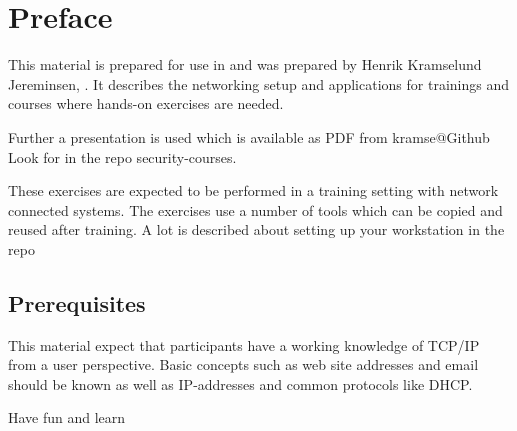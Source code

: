 \documentclass[a4paper,11pt,notitlepage]{report}
\begin{document}
\rm
{}

\newcommand{\subject}[1]{Software Security course}
\newcommand{\kursus}[1]{Software Security course}
\newcommand{\kursusnavn}[1]{Software Security course\\ exercises}



\setcounter{tocdepth}{0}

\normal

{\color{titlecolor}\tableofcontents}

\normal
\pagestyle{fancyplain}
\chapter*{\color{titlecolor}Preface}

This material is prepared for use in \emph{\kursus} and was prepared by
Henrik Kramselund Jereminsen,  .
It describes the networking setup and
applications for trainings and courses where hands-on exercises are needed.

Further a presentation is used which is available as PDF from kramse@Github\\
Look for \jobname in the repo security-courses.

These exercises are expected to be performed in a training setting with network connected systems. The exercises use a number of tools which can be copied and reused after training. A lot is described about setting up your workstation in the repo



\section*{\color{titlecolor}Prerequisites}

This material expect that participants have a working knowledge of
TCP/IP from a user perspective. Basic concepts such as web site addresses and email should be known as well as IP-addresses and common protocols like DHCP.

\vskip 1cm
Have fun and learn
\eject

\rhead{\fancyplain{}{\bf \chaptername\ \thechapter}}
\end{document}
